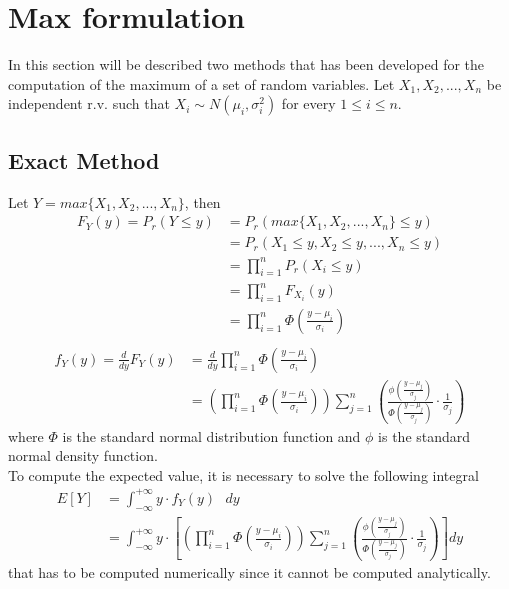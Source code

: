 \section{Max formulation}\label{max_formulation}

In this section will be described two methods that has been developed for the computation of the maximum of a set of random variables.
Let $X_1, X_2, ..., X_n$ be independent r.v. such that $X_i \sim N(\mu_i, \sigma_i^2)$ for every $1 \leq i \leq n.$

\subsection{Exact Method}
Let $Y = max\{X_1, X_2, ..., X_n\}$, then
\begin{align*}
	F_Y(y) = P_r(Y \leq y) &= P_r(max\{X_1, X_2, ..., X_n\} \leq y) \\
	&= P_r(X_1 \leq y, X_2 \leq y, ..., X_n \leq y) \\
	&= \prod_{i = 1}^n P_r(X_i \leq y)  \tag*{(by indipendence of r.v)} \\
	&= \prod_{i = 1}^n F_{X_i}(y)  \\
	&= \prod_{i = 1}^n \Phi\left(\frac{y - \mu_i}{\sigma_i}\right) \\
\end{align*}
\begin{align*}
	f_Y(y) = \frac{d}{dy} F_Y(y) &= \frac{d}{dy} \prod_{i = 1}^n \Phi\left(\frac{y - \mu_i}{\sigma_i}\right) \\
	&= \left(\prod_{i = 1}^n \Phi\left(\frac{y - \mu_i}{\sigma_i}\right)\right) \sum_{j = 1}^n \left(\frac{\phi\left(\frac{y - \mu_j}{\sigma_j}\right)}{\Phi\left(\frac{y - \mu_j}{\sigma_j}\right)} \cdot \frac{1}{\sigma_j}\right)
\end{align*}
where $\Phi$ is the standard normal distribution function and $\phi$ is the standard normal density function. \\
To compute the expected value, it is necessary to solve the following integral
\begin{align*}
	E[Y] &= \int_{-\infty}^{+\infty} y \cdot f_Y(y)\text{ }dy \\
	&= \int_{-\infty}^{+\infty} y \cdot \left[\left(\prod_{i = 1}^n \Phi\left(\frac{y - \mu_i}{\sigma_i}\right)\right) \sum_{j = 1}^n \left(\frac{\phi\left(\frac{y - \mu_j}{\sigma_j}\right)}{\Phi\left(\frac{y - \mu_j}{\sigma_j}\right)} \cdot \frac{1}{\sigma_j}\right)\right]dy
\end{align*}
that has to be computed numerically since it cannot be computed analytically.

